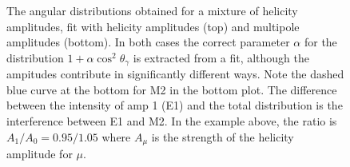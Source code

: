 \documentclass[11pt]{article}
\begin{document}
\begin{figure}
  \hfill
  \caption{
    The angular distributions obtained for a mixture of helicity
    amplitudes, fit with helicity amplitudes (top) and multipole
    amplitudes (bottom). In both cases the correct parameter $\alpha$ for
    the distribution $1 + \alpha \cos^{2} \theta_{\gamma}$ is extracted
    from a fit, although the ampitudes contribute in significantly
    different ways. Note the dashed blue curve at the bottom for M2 in
    the bottom plot. The difference between the intensity of amp 1 (E1)
    and the total distribution is the interference between E1 and M2. In
    the example above, the ratio is $A_{1}/A_{0}=0.95/1.05$ where
    $A_{\mu}$ is the strength of the helicity amplitude for $\mu$.
  }
  \label{fig:fits_helicity}
\end{figure}
\end{document}
